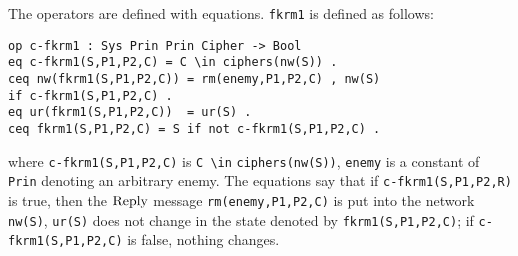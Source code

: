 \documentclass[a4paper,fleqn]{cas-dc}
\begin{document}
The operators are defined with equations. \verb!fkrm1! is defined as follows:
\begin{verbatim}
op c-fkrm1 : Sys Prin Prin Cipher -> Bool
eq c-fkrm1(S,P1,P2,C) = C \in ciphers(nw(S)) .
ceq nw(fkrm1(S,P1,P2,C)) = rm(enemy,P1,P2,C) , nw(S) 
if c-fkrm1(S,P1,P2,C) .
eq ur(fkrm1(S,P1,P2,C))  = ur(S) .
ceq fkrm1(S,P1,P2,C) = S if not c-fkrm1(S,P1,P2,C) .
\end{verbatim}
\noindent
where \verb!c-fkrm1(S,P1,P2,C)! is \verb!C \in! \verb!ciphers(nw(S))!, 
\verb!enemy! is a constant of \verb!Prin! denoting an arbitrary enemy.
The equations say that if \verb!c-fkrm1(S,P1,P2,R)! is true, then the $\rm Reply$ message \verb!rm(enemy,P1,P2,C)! is put into the network \verb!nw(S)!, \verb!ur(S)! does not change in the state denoted by \verb!fkrm1(S,P1,P2,C)!; if \verb!c-fkrm1(S,P1,P2,C)! is false, nothing changes. 
\end{document}
